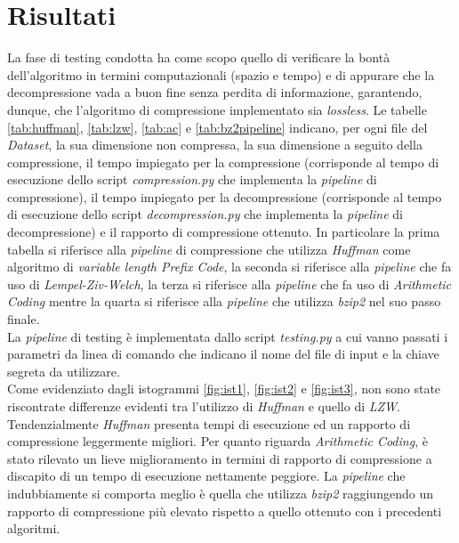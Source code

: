 \section{Risultati}\label{section:risultati}
La fase di testing condotta ha come scopo quello di verificare la bontà dell'algoritmo in termini computazionali (spazio e tempo) e di appurare che la decompressione vada a buon fine senza perdita di informazione, garantendo, dunque, che l'algoritmo di compressione implementato sia \emph{lossless}. Le tabelle \ref{tab:huffman}, \ref{tab:lzw}, \ref{tab:ac} e \ref{tab:bz2pipeline} indicano, per ogni file del \emph{Dataset}, la sua dimensione non compressa, la sua dimensione a seguito della compressione, il tempo impiegato per la compressione (corrisponde al tempo di esecuzione dello script \emph{compression.py} che implementa la \emph{pipeline} di compressione), il tempo impiegato per la decompressione (corrisponde al tempo di esecuzione dello script \emph{decompression.py} che implementa la \emph{pipeline} di decompressione) e il rapporto di compressione ottenuto. In particolare la prima tabella si riferisce alla \emph{pipeline} di compressione che utilizza \emph{Huffman} come algoritmo di \emph{variable length Prefix Code}, la seconda si riferisce alla \emph{pipeline} che fa uso di \emph{Lempel-Ziv-Welch}, la terza si riferisce alla \emph{pipeline} che fa uso di \emph{Arithmetic Coding} mentre la quarta si riferisce alla \emph{pipeline} che utilizza \emph{bzip2} nel suo passo finale.\\ La \emph{pipeline} di testing è implementata dallo script \emph{testing.py} a cui vanno passati i parametri da linea di comando che indicano il nome del file di input e la chiave segreta da utilizzare.\\
Come evidenziato dagli istogrammi \ref{fig:ist1}, \ref{fig:ist2} e \ref{fig:ist3}, non sono state riscontrate differenze evidenti tra l'utilizzo di \emph{Huffman} e quello di \emph{LZW}. Tendenzialmente \emph{Huffman} presenta tempi di esecuzione ed un rapporto di compressione leggermente migliori. Per quanto riguarda \emph{Arithmetic Coding}, è stato rilevato un lieve miglioramento in termini di rapporto di compressione a discapito di un tempo di esecuzione nettamente peggiore. La \emph{pipeline} che indubbiamente si comporta meglio è quella che utilizza \emph{bzip2} raggiungendo un rapporto di compressione più elevato rispetto a quello ottenuto con i precedenti algoritmi.
